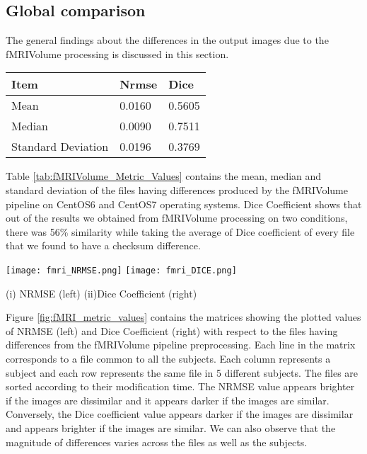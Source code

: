 \subsection{Global comparison}
The general findings about the differences in the output images due to the fMRIVolume processing is discussed in this section.

\begin{center}
\begin{tabular}{|l|l|l|}
\hline
\textbf{Item}      & \textbf{Nrmse}  & \textbf{Dice} \\ \hline
Mean               & 0.0160    & 0.5605   \\ \hline
Median             & 0.0090     & 0.7511   \\ \hline
Standard Deviation & 0.0196     & 0.3769   \\ \hline
\end{tabular}
\label{tab:fMRIVolume_Metric_Values}
\end{center}

Table \ref{tab:fMRIVolume_Metric_Values} contains the mean, median and standard deviation of the files having differences produced by the fMRIVolume pipeline on CentOS6 and CentOS7 operating systems. Dice Coefficient shows that out of the results we obtained from fMRIVolume processing on two conditions, there was 56\% similarity while taking the average of Dice coefficient of every file that we found to have a checksum difference.

\begin{center}
\texttt{[image: fmri\_NRMSE.png]}%
\texttt{[image: fmri\_DICE.png]}
\caption*{(i) NRMSE (left) (ii)Dice Coefficient (right)}
\label{fig:fMRI_metric_values}
\end{center}

Figure \ref{fig:fMRI_metric_values} contains the matrices showing the plotted values of NRMSE (left) and Dice Coefficient (right) with respect to the files having differences from the fMRIVolume pipeline preprocessing. Each line in the matrix corresponds to a file common to all the subjects. Each column represents a subject and each row represents the same file in 5 different subjects. The files are sorted according to their modification time. The NRMSE value appears brighter if the images are dissimilar and it appears darker if the images are similar. Conversely, the Dice coefficient value appears darker if the images are dissimilar and appears brighter if the images are similar. We can also observe that the magnitude of differences varies across the files as well as the subjects.

